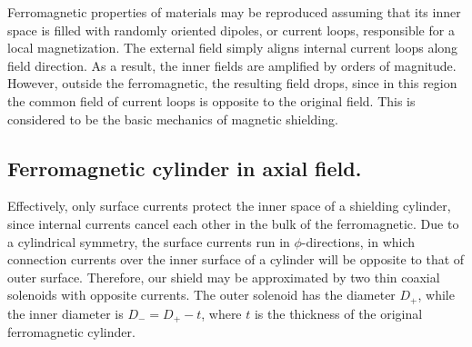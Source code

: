 \documentclass[12pt]{article}
\begin{document}
Ferromagnetic properties of materials may be reproduced assuming that its  
inner space is filled with  randomly oriented  dipoles, or current loops, responsible for 
a local  magnetization. The external  field simply aligns internal current loops along 
field  direction. As a result, the inner fields are amplified by  
orders of magnitude. However, outside the ferromagnetic, the resulting field  
drops, since in this region the  common field of  current loops  
is opposite to the original  field. 
This is considered to be the basic mechanics of magnetic shielding.


\subsection{Ferromagnetic cylinder in axial field.}
Effectively, only surface currents protect the inner space of a shielding cylinder, since 
internal  currents cancel each other in the bulk of the ferromagnetic.
Due to a cylindrical symmetry, the surface  currents  run in $\phi$-directions,
in which connection  currents over the inner surface of a cylinder
will be opposite to that of  outer surface. Therefore, our shield  
may be approximated by two  thin coaxial solenoids with opposite currents.
The outer solenoid has the diameter $D_+$, while the inner diameter is
$D_-=D_+-t$, where $t$ is the thickness of the original ferromagnetic cylinder.
\end{document}
